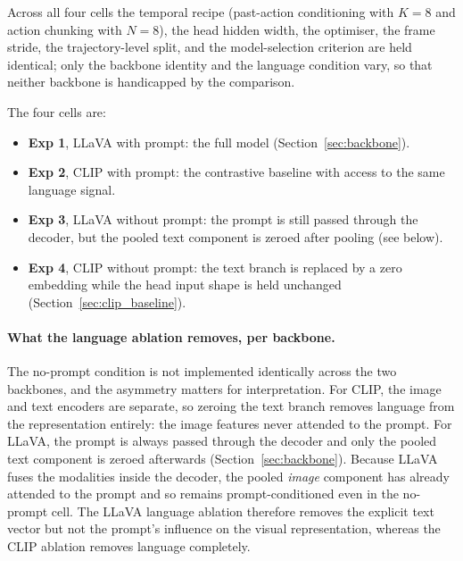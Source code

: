 Across all four cells the temporal recipe (past-action conditioning with
$K = 8$ and action chunking with $N = 8$), the head hidden width, the
optimiser, the frame stride, the trajectory-level split, and the
model-selection criterion are held identical; only the backbone identity and
the language condition vary, so that neither backbone is handicapped by the
comparison.

The four cells are:
\begin{itemize}
    \item \textbf{Exp 1}, LLaVA with prompt: the full model
          (Section~\ref{sec:backbone}).
    \item \textbf{Exp 2}, CLIP with prompt: the contrastive baseline with
          access to the same language signal.
    \item \textbf{Exp 3}, LLaVA without prompt: the prompt is still passed
          through the decoder, but the pooled text component is zeroed after
          pooling (see below).
    \item \textbf{Exp 4}, CLIP without prompt: the text branch is replaced by
          a zero embedding while the head input shape is held unchanged
          (Section~\ref{sec:clip_baseline}).
\end{itemize}

\paragraph{What the language ablation removes, per backbone.} The no-prompt
condition is not implemented identically across the two backbones, and the
asymmetry matters for interpretation. For CLIP, the image and text encoders
are separate, so zeroing the text branch removes language from the
representation entirely: the image features never attended to the prompt. For
LLaVA, the prompt is always passed through the decoder and only the pooled
text component is zeroed afterwards (Section~\ref{sec:backbone}). Because
LLaVA fuses the modalities inside the decoder, the pooled \emph{image}
component has already attended to the prompt and so remains prompt-conditioned
even in the no-prompt cell. The LLaVA language ablation therefore removes the
explicit text vector but not the prompt's influence on the visual
representation, whereas the CLIP ablation removes language completely.

